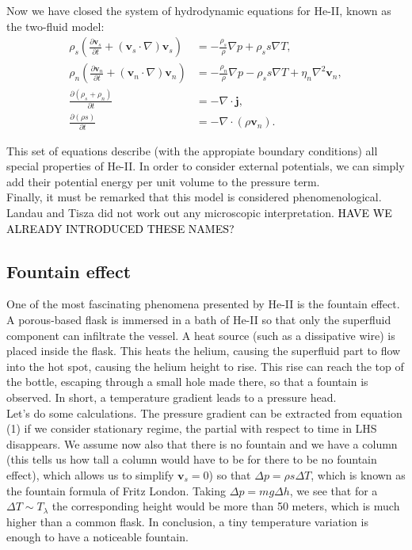 \documentclass{article}
\newcommand{\black}{\textcolor{black}}
\begin{document}
Now we have closed the system of hydrodynamic equations for He-II, known as the two-fluid model:
\begin{align}
\rho_s \left( \frac{\partial \mathbf{v}_s}{\partial t} + (\mathbf{v}_s \cdot \nabla) \mathbf{v}_s \right) &= -\frac{\rho_s}{\rho} \nabla p + \rho_s s \nabla T,  \\
\rho_n \left( \frac{\partial \mathbf{v}_n}{\partial t} + (\mathbf{v}_n \cdot \nabla) \mathbf{v}_n \right) &= -\frac{\rho_n}{\rho} \nabla p - \rho_s s \nabla T + \eta_n \nabla^2 \mathbf{v}_n,  \\
\frac{\partial (\rho_s + \rho_n)}{\partial t} &= -\nabla \cdot \mathbf{j}, \\
\frac{\partial (\rho s)}{\partial t} &= -\nabla \cdot (\rho \mathbf{v}_n). 
\end{align}

This set of equations describe (with the appropiate boundary conditions) all special properties of He-II. In order to consider external potentials, we can simply add their potential energy per unit volume to the pressure term. 
\\

Finally, it must be remarked that this model is considered phenomenological. Landau and Tisza did not work out any microscopic interpretation. \black{HAVE WE ALREADY INTRODUCED THESE NAMES?}

\subsection{Fountain effect}


One of the most fascinating phenomena presented by He-II is the fountain effect. A porous-based flask is immersed in a bath of He-II so that only the superfluid component can infiltrate the vessel. A heat source (such as a dissipative wire) is placed inside the flask. This heats the helium, causing the superfluid part to flow into the hot spot, causing the helium height to rise. This rise can reach the top of the bottle, escaping through a small hole made there, so that a fountain is observed. In short, a temperature gradient leads to a pressure head.
\\

Let's do some calculations. The pressure gradient can be extracted from equation (1) if we consider stationary regime, the partial with respect to time in LHS disappears. We assume now also that there is no fountain and we have a column (this tells us how tall a column would have to be for there to be no fountain effect), which allows us to simplify $\mathbf{v}_s = 0$) so that $\Delta p = \rho s \Delta T$, which is known as the fountain formula of Fritz London. Taking $\Delta p = mg \Delta h$, we see that for a $\Delta T \sim T_\lambda$ the corresponding height would be more than 50 meters, which is much higher than a common flask. In conclusion, a tiny temperature variation is enough to have a noticeable fountain.
\end{document}
